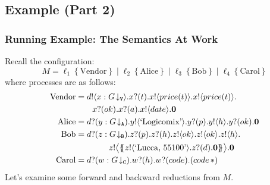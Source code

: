 \documentclass[12pt]{beamer}
\newcommand{\pS}{\ensuremath{\mathtt{V}}\xspace}
\newcommand{\blrangle}[1]{\big\langle #1 \big\rangle}
\newcommand{\blue}[1]{\structure{#1}}
\newcommand{\fn}{\mathtt{fn}}
\newcommand{\abs}[2]{\lambda #1.\,#2}
\newcommand{\outses}{!}
\newcommand{\inpses}{?}
\newcommand{\tproj}[2]{#1\!\downarrow_{#2}}
\newcommand{\Par}{\;|\;}
\newcommand{\freev}[1]{\langle #1\rangle}
\newcommand{\boundv}[1]{(#1)}
\newcommand{\shsep}{.}
\newcommand{\appl}[2]{#1\, {#2}}
\newcommand{\bout}[2]{#1 \outses \freev{#2} \shsep}
\newcommand{\bbout}[2]{#1 \outses \blrangle{#2} \shsep}
\newcommand{\binp}[2]{#1 \inpses \boundv{#2} \shsep}
\newcommand{\myloc}[2]{#1\left\{#2\right\}}
\newcommand{\loc}{\ell}
\newcommand{\inact}{\mathbf{0}}
\newcommand{\pA}{\ensuremath{\mathtt{A}}\xspace}
\newcommand{\pB}{\ensuremath{\mathtt{B}}\xspace}
\newcommand{\pC}{\ensuremath{\mathtt{C}}\xspace}
\newcommand{\exBook}{\text{`Logicomix'}}
\newcommand{\thunkp}[1]{\ensuremath\{\!\!\{#1\}\!\!\}}
\newcommand{\dummyn}{\ensuremath{\ast}}
\begin{document}
\subsection{Example (Part 2)}
\begin{frame}
\frametitle{Running Example: The Semantics At Work}

Recall the configuration:
	$$M = \myloc{\loc_1}{\text{Vendor}} 
\Par
\myloc{\loc_2}{\text{Alice}} 
\Par
\myloc{\loc_3}{\text{Bob}} 
\Par 
\myloc{\loc_4}{\text{Carol}} 
$$
where processes are as follows:
\begin{align*}
\text{Vendor} & =  \bout{d}{x:\tproj{G}{\pS}}\binp{x}{t}\bout{x}{price(t)}\bout{x}{price(t)}\\
& \qquad \binp{x}{ok}\binp{x}{a} \bout{x}{date}\inact  
\\
\text{Alice} & =  \binp{d}{y:\tproj{G}{\pA}}\bout{y}{\exBook}\binp{y}{p}\bout{y}{h}\binp{y}{ok}\inact  
\\
\text{Bob} & =  \binp{d}{z:\tproj{G}{\pB}}\binp{z}{p}\binp{z}{h}\bout{z}{ok}\bout{z}{ok}\bout{z}{h}
  \\
  & \qquad \qquad \bbout{z}{\thunkp{\bout{z}{\text{`Lucca, 55100'}}\binp{z}{d}\inact}}\inact
  \\
\text{Carol} & =  \binp{d}{w:\tproj{G}{\pC}}\binp{w}{h}\binp{w}{code}(\appl{code}{\dummyn})
\end{align*}
Let's examine some forward and backward reductions from $M$. 

\end{frame}
\end{document}
